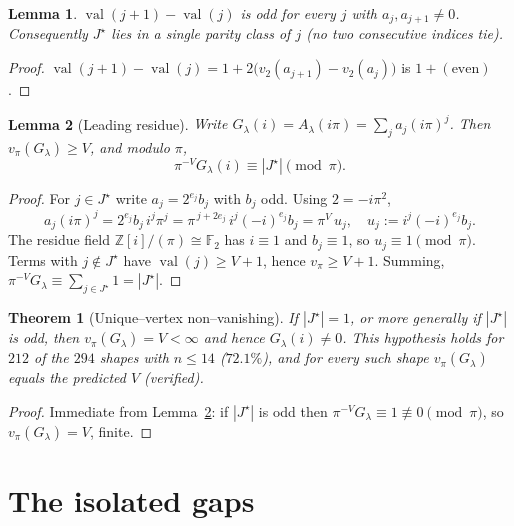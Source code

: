 \documentclass[11pt]{article}
\newtheorem{theorem}{Theorem}
\newtheorem{lemma}{Lemma}
\theoremstyle{definition}
\DeclareMathOperator{\val}{val}
\newcommand{\la}{\lambda}
\newcommand{\Z}{\mathbb{Z}}
\begin{document}
\begin{lemma}\label{lem:parity}
$\val(j+1)-\val(j)$ is odd for every $j$ with $a_j,a_{j+1}\ne0$.  Consequently
$J^\star$ lies in a single parity class of $j$ (no two consecutive indices tie).
\end{lemma}
\begin{proof}
$\val(j+1)-\val(j)=1+2\bigl(v_2(a_{j+1})-v_2(a_j)\bigr)$ is $1+(\text{even})$.
\end{proof}

\begin{lemma}[Leading residue]\label{lem:lead}
Write $G_\la(i)=A_\la(i\pi)=\sum_j a_j(i\pi)^j$.  Then
$v_\pi(G_\la)\ge V$, and modulo $\pi$,
\[
\pi^{-V}G_\la(i)\equiv |J^\star|\pmod\pi .
\]
\end{lemma}
\begin{proof}
For $j\in J^\star$ write $a_j=2^{e_j}b_j$ with $b_j$ odd.  Using $2=-i\pi^2$,
\[
a_j(i\pi)^j=2^{e_j}b_j\,i^j\pi^j=\pi^{\,j+2e_j}\,i^j(-i)^{e_j}b_j=\pi^{V}\,u_j,
\quad u_j:=i^j(-i)^{e_j}b_j .
\]
The residue field $\Z[i]/(\pi)\cong\mathbb F_2$ has $i\equiv1$ and $b_j\equiv1$, so
$u_j\equiv1\pmod\pi$.  Terms with $j\notin J^\star$ have $\val(j)\ge V+1$, hence
$v_\pi\ge V+1$.  Summing, $\pi^{-V}G_\la\equiv\sum_{j\in J^\star}1=|J^\star|$.
\end{proof}

\begin{theorem}[Unique--vertex non--vanishing]\label{thm:partial}
If $|J^\star|=1$, or more generally if $|J^\star|$ is odd, then $v_\pi(G_\la)=V<\infty$
and hence $G_\la(i)\ne0$.  This hypothesis holds for $212$ of the $294$ shapes
with $n\le14$ ($72.1\%$), and for every such shape $v_\pi(G_\la)$ equals the
predicted $V$ (verified).
\end{theorem}
\begin{proof}
Immediate from Lemma~\ref{lem:lead}: if $|J^\star|$ is odd then
$\pi^{-V}G_\la\equiv1\not\equiv0\pmod\pi$, so $v_\pi(G_\la)=V$, finite.
\end{proof}

\section{The isolated gaps}
\end{document}
